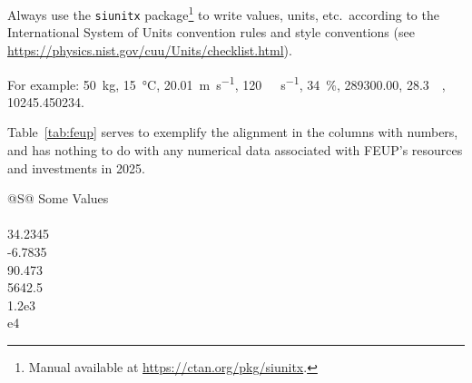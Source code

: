 Always use the \texttt{siunitx} package\footnote{Manual available at 
\url{https://ctan.org/pkg/siunitx}.} to write values, units, etc.\ 
according to the International System of Units convention rules and style conventions (see \url{https://physics.nist.gov/cuu/Units/checklist.html}).

For example:
\SI{50}{\kilo\gram}, 
\SI{15}{\celsius}, 
\SI{20,01}{\meter\per\second}, 
\SI{120}{\kilo\byte\per\second}, 
\SI{34}{\percent}, 
\SI{289300.00}{\eurocurrency}, 
\SI{28.3}{\mega\eurocurrency}, 
\num{10245.450234}.

Table~\ref{tab:feup} %
serves to exemplify the alignment in the columns with numbers, and has nothing to do with any numerical data associated with \acs*{FEUP}'s resources and investments in 2025.

\begin{table}
  \centering
  \caption[Physical Resources of \acs*{FEUP}]{Physical Resources of \acs*{FEUP}~\parencite{kn:feup}.}
  \begin{tabular}{@{}S@{}}
    \toprule
    {Some Values} \\
     \\
    34.2345 \\
    -6.7835 \\
    90.473 \\
    5642.5 \\
    1.2e3 \\
    e4 \\
    \bottomrule
  \end{tabular}
  \label{tab:feup}
\end{table}


